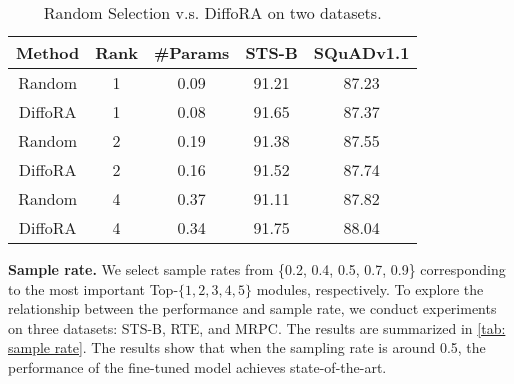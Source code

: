 \begin{table}
  \centering
  \begin{tabular}{c|c|c|c|c}
    \toprule
    Method  &Rank&\#Params&STS-B& SQuADv1.1\\
    \midrule
    Random & 1 & 0.09& 91.21&  87.23  \\
    \rowcolor{gray!20}DiffoRA & 1 & 0.08& 91.65 & 87.37 \\
    \midrule
    Random & 2 &0.19  & 91.38& 87.55  \\
    \rowcolor{gray!20}DiffoRA & 2 &0.16 & 91.52 & 87.74 \\
    \midrule
    Random &4 &0.37 & 91.11 & 87.82 \\
    \rowcolor{gray!20}DiffoRA & 4&0.34 & 91.75&  88.04 \\
    \bottomrule
  \end{tabular}
  \caption{Random Selection v.s. DiffoRA on two datasets.}
  \label{tab: random vs diffora}
\end{table}







\noindent\textbf{Sample rate. } 
We select sample rates from \{0.2, 0.4, 0.5, 0.7, 0.9\} corresponding to the most important Top-$\{1, 2, 3, 4, 5\}$ modules, respectively. 
To explore the relationship between the performance and sample rate, we conduct experiments on three datasets: STS-B, RTE, and MRPC. The results are summarized in \cref{tab: sample rate}.
The results show that when the sampling rate is around 0.5, the performance of the fine-tuned model achieves state-of-the-art.


